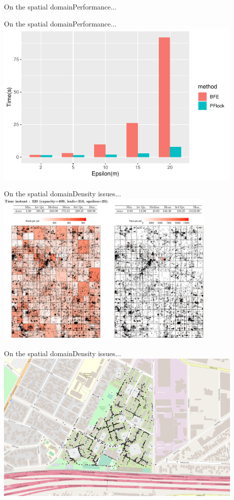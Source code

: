 \documentclass{beamer}
\begin{document}
\begin{frame}{On the spatial domain}{Performance...}
\begin{figure}
\begin{subfigure}[t]{0.32\textwidth}
        \end{subfigure}
    \end{figure}
\end{frame}

\begin{frame}{On the spatial domain}{Performance...}
    \centering
    \includegraphics[width=0.9\textwidth]{figures/R/MF/PFlockVsBFE2.pdf}
\end{frame}

\begin{frame}{On the spatial domain}{Density issues...}
    \centering
    \includegraphics[width=0.8\textwidth]{figures/density.png}
\end{frame}

\begin{frame}{On the spatial domain}{Density issues...}
    \centering
    \includegraphics[width=0.9\textwidth]{figures/LA_T320_N50K_dense.png}
\end{frame}
\end{document}
